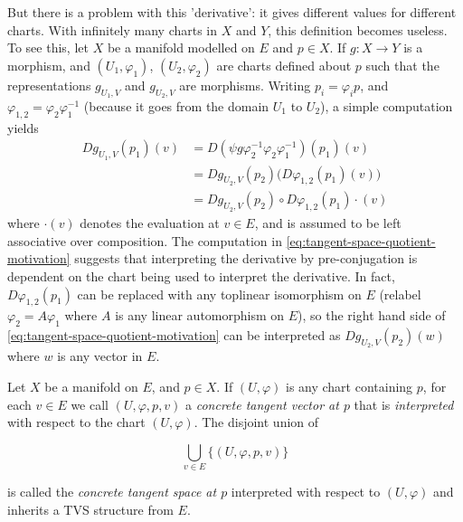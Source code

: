 \documentclass[../main-manifolds.tex]{subfiles}
\begin{document}
But there is a problem with this 'derivative': it gives different values for different charts. With infinitely many charts in $X$ and $Y$, this definition becomes useless. To see this, let $X$ be a manifold modelled on $E$ and $p\in X$. If $g: X\to Y$ is a morphism, and $(U_1,\varphi_1)$, $(U_2,\varphi_2)$ are charts defined about $p$ such that the representations $g_{U_1, V}$ and $g_{U_2, V}$ are morphisms. Writing $p_i = \varphi_i p$, and $\varphi_{1,2}=\varphi_2\varphi_{1}^{-1}$ (because it goes from the domain $U_1$ to $U_2$), a simple computation yields
\begin{align}
    Dg_{U_1, V}(p_1)(v) &= D(\psi g \varphi_2^{-1}\varphi_2\varphi_1^{-1})(p_1)(v) \nonumber\\
    &= Dg_{U_2,V}(p_2)\biggl(D\varphi_{1,2}(p_1)(v)\biggr)\nonumber\\
    &= Dg_{U_2,V}(p_2)\circ D\varphi_{1,2}(p_1)\cdot (v)\label{eq:tangent-space-quotient-motivation}
\end{align}
where $\cdot(v)$ denotes the evaluation at $v\in E$, and is assumed to be left associative over composition. The computation in \cref{eq:tangent-space-quotient-motivation} suggests that interpreting the derivative by pre-conjugation is dependent on the chart being used to interpret the derivative. In fact, $D\varphi_{1,2}(p_1)$ can be replaced with any toplinear isomorphism on $E$ (relabel $\varphi_2 = A\varphi_1$ where $A$ is any linear automorphism on $E$), so the right hand side of \cref{eq:tangent-space-quotient-motivation} can be interpreted as $Dg_{U_2,V}(p_2)(w)$ where $w$ is any vector in $E$. 

\begin{definition}
    Let $X$ be a manifold on $E$, and $p\in X$. If $(U,\varphi)$ is any chart containing $p$, for each $v\in E$ we call $(U,\varphi,p,v)$ a \emph{concrete tangent vector at $p$} that is \emph{interpreted} with respect to the chart $(U,\varphi)$. The disjoint union of

    \begin{equation}\label{eq:concrete-tangent-space-eq}
        \bigcup_{v\in E}\{(U,\varphi,p,v)\}
    \end{equation}

    is called the \emph{concrete tangent space at $p$} interpreted with respect to $(U,\varphi)$ and inherits a TVS structure from $E$.
\end{definition}
\end{document}
